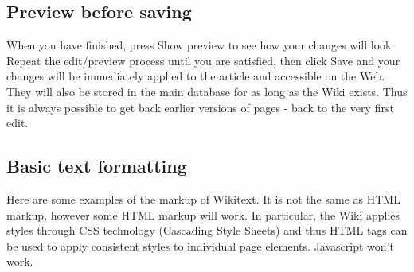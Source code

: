 \documentclass[]{book}
\begin{document}
\subsection{Preview before saving}\label{preview-before-saving}

When you have finished, press Show preview to see how your changes will
look. Repeat the edit/preview process until you are satisfied, then
click Save and your changes will be immediately applied to the article
and accessible on the Web. They will also be stored in the main database
for as long as the Wiki exists. Thus it is always possible to get back
earlier versions of pages - back to the very first edit.

\subsection{Basic text formatting}\label{basic-text-formatting}

Here are some examples of the markup of Wikitext. It is not the same as
HTML markup, however some HTML markup will work. In particular, the Wiki
applies styles through CSS technology (Cascading Style Sheets) and thus
HTML tags can be used to apply consistent styles to individual page
elements. Javascript won't work.
\end{document}
